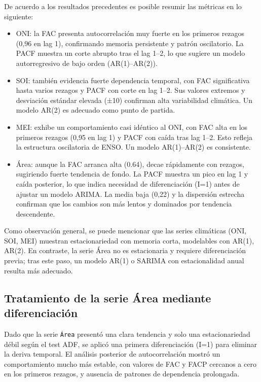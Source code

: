 De acuerdo a los resultados precedentes es posible resumir las métricas en lo siguiente:
\begin{itemize}
    \item ONI: la FAC presenta autocorrelación muy fuerte en los primeros rezagos 
    (0,96 en lag 1), confirmando memoria persistente y patrón oscilatorio. La PACF muestra 
    un corte abrupto tras el lag 1–2, lo que sugiere un modelo autorregresivo de bajo orden 
    (AR(1)–AR(2)).
    
    \item SOI: también evidencia fuerte dependencia temporal, con FAC significativa 
    hasta varios rezagos y PACF con corte en lag 1–2. Sus valores extremos y desviación 
    estándar elevada (±10) confirman alta variabilidad climática. Un modelo AR(2) es adecuado 
    como punto de partida.
    
    \item MEI: exhibe un comportamiento casi idéntico al ONI, con FAC alta en los 
    primeros rezagos (0,95 en lag 1) y PACF con caída tras lag 1–2. Esto refleja la estructura 
    oscilatoria de ENSO. Un modelo AR(1)–AR(2) es consistente.
    
    \item Área: aunque la FAC arranca alta (0.64), decae rápidamente con rezagos, 
    sugiriendo fuerte tendencia de fondo. La PACF muestra un pico en lag 1 y caída posterior, 
    lo que indica necesidad de diferenciación (I=1) antes de ajustar un modelo ARIMA. La media 
    baja (0,22) y la dispersión estrecha confirman que los cambios son más lentos y dominados 
    por tendencia descendente.
\end{itemize}




Como observación general, se puede mencionar que las series climáticas (ONI, SOI, MEI) muestran 
estacionariedad con memoria corta, modelables con AR(1), AR(2). En contraste, la serie 
Área no es estacionaria y requiere diferenciación previa; tras este paso, un modelo AR(1) 
o SARIMA con estacionalidad anual resulta más adecuado.

\subsection{Tratamiento de la serie Área mediante diferenciación}

Dado que la serie \texttt{Área} presentó una clara tendencia y solo una estacionariedad débil según 
el test ADF, se aplicó una primera diferenciación (I=1) para eliminar la deriva temporal. 
El análisis posterior de autocorrelación mostró un comportamiento mucho más estable, con 
valores de FAC y FACP cercanos a cero en los primeros rezagos, y ausencia de patrones de 
dependencia prolongada.

